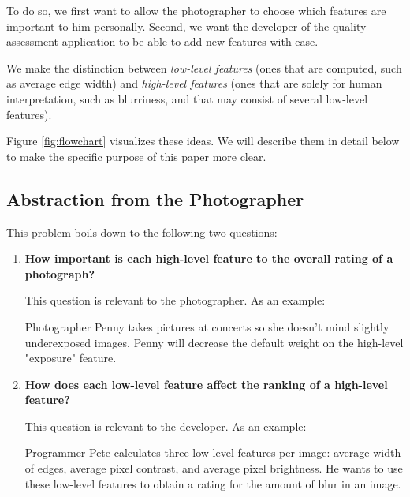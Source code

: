 \documentclass[10pt,twocolumn]{article}
\begin{document}
To do so, we first want to allow the photographer to choose which features are important to him personally.
Second, we want the developer of the quality-assessment application to be able to add new features with ease.

We make the distinction between \textit{low-level features} (ones that are computed, such as average edge width) and \textit{high-level features} (ones that are solely for human interpretation, such as blurriness, and that may consist of several low-level features). 

Figure \ref{fig:flowchart} visualizes these ideas. We will describe them in detail below to make the specific purpose of this paper more clear.

\begin{figure*}[t!]
  \caption{An example flowchart. Here, the application computes three low-level features. All three influence the two high-level features: blurriness and exposure. The developer controls which features are present. The photographer decides how to weight each high-level feature.}
  \label{fig:flowchart}
\end{figure*}

\subsection{Abstraction from the Photographer}
\label{abstraction}
This problem boils down to the following two questions:

\begin{enumerate}
\item \textbf{How important is each high-level feature to the overall rating of a photograph?}

This question is relevant to the photographer. As an example:

Photographer Penny takes pictures at concerts so she doesn't mind slightly underexposed images. Penny will decrease the default weight on the high-level "exposure" feature.

\item \textbf{How does each low-level feature affect the ranking of a high-level feature?}

This  question is relevant to the developer. As an example:

Programmer Pete calculates three low-level features per image: average width of edges, average pixel contrast, and average pixel brightness. He wants to use these low-level features to obtain a rating for the amount of blur in an image.
\end{enumerate}
\end{document}
